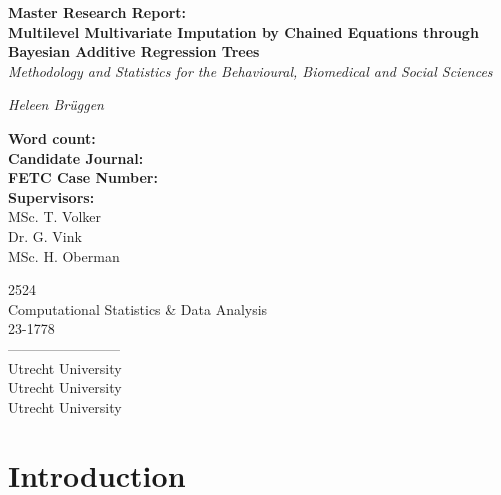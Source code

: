 \documentclass[10pt, a4paper, titlepage]{article}
\begin{document}
\begin{titlingpage}
\begin{center}
\Huge\textbf{Master Research Report:  \\ Multilevel Multivariate Imputation by Chained Equations through Bayesian Additive Regression Trees} \\
\Large\textit{Methodology and Statistics for the Behavioural, Biomedical and Social Sciences}

\vspace{.5cm}

\normalsize\textit{Heleen Brüggen}

\vspace{15cm}

\begin{minipage}{0.5\textwidth}
\begin{flushleft}

\textbf{Word count:} \\
\textbf{Candidate Journal:} \\
\textbf{FETC Case Number:} \\
\textbf{Supervisors:} \\
MSc. T. Volker \\
Dr. G. Vink \\
 MSc. H. Oberman
\end{flushleft}
\end{minipage}%
\begin{minipage}{0.5\textwidth}
\begin{flushright}

2524 \\
Computational Statistics \& Data Analysis \\
23-1778 \\
------------------------\\
Utrecht University \\
Utrecht University \\
Utrecht University
\end{flushright}
\end{minipage}

\end{center}
\end{titlingpage}

\newpage

\section{Introduction}
\end{document}
